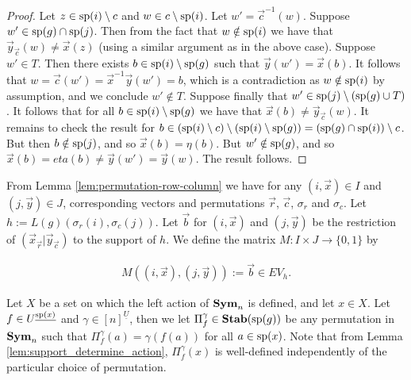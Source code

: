 \documentclass[../paper.tex]{subfiles}
\begin{document}
\begin{proof}
  Let $z \in \text{sp}(i) \setminus c$ and $w \in c \setminus \text{sp}(i)$. Let $w' =
  \vec{c}^{-1}(w)$. Suppose $w' \in \text{sp}(g) \cap \text{sp}(j)$. Then from the
  fact that $w \notin \text{sp}(i)$ we have that $\vec{y}_{\vec{c}}(w) \neq
  \vec{x}(z)$ (using a similar argument as in the above case). Suppose $w' \in
  T$. Then there exists $b \in \text{sp}(i) \setminus \text{sp}(g)$ such that
  $\vec{y}(w') = \vec{x}(b)$. It follows that $w = \vec{c}(w') =
  \vec{x}^{-1}\vec{y} (w') = b$, which is a contradiction as $w \notin
  \text{sp}(i)$ by assumption, and we conclude $w' \notin T$. Suppose finally that
  $w' \in \text{sp}(j) \setminus (\text{sp}(g) \cup T)$. It follows that for all $b
  \in \text{sp}(i) \setminus \text{sp}(g)$ we have that $\vec{x}(b) \neq
  \vec{y}_{\vec{c}}(w)$. It remains to check the result for $b \in (\text{sp}(i)
  \setminus c) \setminus (\text{sp}(i) \setminus \text{sp}(g)) = (\text{sp}(g) \cap
  \text{sp}(i)) \setminus c$. But then $b \notin \text{sp}(j)$, and so $\vec{x}(b) =
  \eta (b)$. But $w' \notin \text{sp}(g)$, and so $\vec{x}(b) = eta(b) \neq
  \vec{y}(w') = \vec{y}(w)$. The result follows.
\end{proof}

From Lemma \ref{lem:permutation-row-column} we have for any $(i, \vec{x}) \in I$
and $(j, \vec{y}) \in J$, corresponding vectors and permutations $\vec{r}$,
$\vec{c}$, $\sigma_r$ and $\sigma_c$. Let $h := L(g)(\sigma_r(i), \sigma_c
(j))$. Let $\vec{b}$ for $(i, \vec{x})$ and $(j, \vec{y})$ be the restriction of
$(\vec{x}_{\vec{r}} \vert \vec{y}_{\vec{c}})$ to the support of $h$. We define
the matrix $M : I \times J \rightarrow \{0,1\}$ by

\begin{align*}
  M((i , \vec{x}), (j, \vec{y})) := \vec{b} \in EV_h.
\end{align*}



Let $X$ be a set on which the left action of $\text{\textbf{Sym}}_n$ is defined, and let $x \in
X$. Let $f \in U^{\underline{\text{sp}(x)}}$ and $\gamma\in [n]^{\underline{U}}$,
then we let $\Pi^{\gamma}_{f} \in \text{\textbf{Stab}} (\text{sp} (g))$ be any permutation in $\text{\textbf{Sym}}_n$
such that $\Pi^{\gamma}_f (a) = \gamma (f(a))$ for all $a \in \text{sp}(x)$. Note
that from Lemma \ref{lem:support_determine_action}, $\Pi^{\gamma}_f(x)$ is
well-defined independently of the particular choice of permutation.
\end{document}
